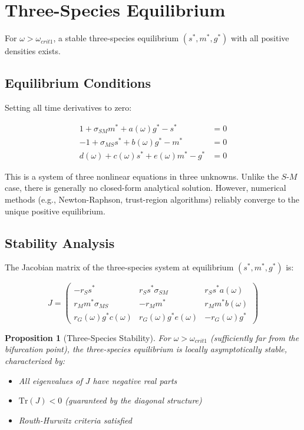 \documentclass[11pt]{article}
\newtheorem{proposition}{Proposition}
\begin{document}
\section{Three-Species Equilibrium}

For $\omega > \omega_{crit1}$, a stable three-species equilibrium $(s^*, m^*, g^*)$ with all positive densities exists.

\subsection{Equilibrium Conditions}

Setting all time derivatives to zero:

\begin{align}
1 + \sigma_{SM} m^* + a(\omega) g^* - s^* &= 0 \label{eq:eq1}\\
-1 + \sigma_{MS} s^* + b(\omega) g^* - m^* &= 0 \label{eq:eq2}\\
d(\omega) + c(\omega) s^* + e(\omega) m^* - g^* &= 0 \label{eq:eq3}
\end{align}

This is a system of three nonlinear equations in three unknowns. Unlike the $S$-$M$ case, there is generally no closed-form analytical solution. However, numerical methods (e.g., Newton-Raphson, trust-region algorithms) reliably converge to the unique positive equilibrium.

\subsection{Stability Analysis}

The Jacobian matrix of the three-species system at equilibrium $(s^*, m^*, g^*)$ is:

\begin{equation}
J = \begin{pmatrix}
-r_S s^* & r_S s^* \sigma_{SM} & r_S s^* a(\omega) \\
r_M m^* \sigma_{MS} & -r_M m^* & r_M m^* b(\omega) \\
r_G(\omega) g^* c(\omega) & r_G(\omega) g^* e(\omega) & -r_G(\omega) g^*
\end{pmatrix}
\end{equation}

\begin{proposition}[Three-Species Stability]
For $\omega > \omega_{crit1}$ (sufficiently far from the bifurcation point), the three-species equilibrium is locally asymptotically stable, characterized by:
\begin{itemize}
    \item All eigenvalues of $J$ have negative real parts
    \item $\text{Tr}(J) < 0$ (guaranteed by the diagonal structure)
    \item Routh-Hurwitz criteria satisfied
\end{itemize}
\end{proposition}
\end{document}
